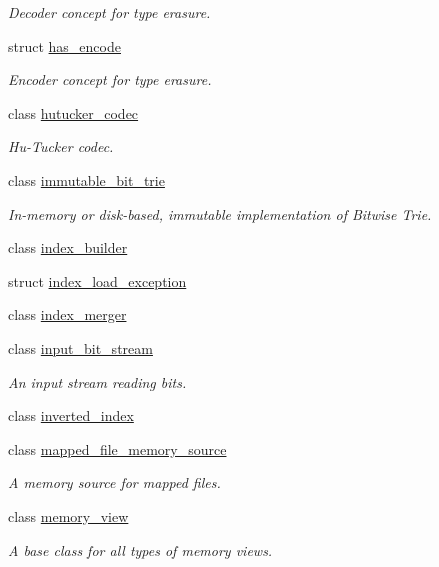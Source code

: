\begin{DoxyCompactItemize}
\begin{DoxyCompactList}\small\item\em Decoder concept for type erasure. \end{DoxyCompactList}\item 
struct \mbox{\hyperlink{structirk_1_1has__encode}{has\+\_\+encode}}
\begin{DoxyCompactList}\small\item\em Encoder concept for type erasure. \end{DoxyCompactList}\item 
class \mbox{\hyperlink{classirk_1_1hutucker__codec}{hutucker\+\_\+codec}}
\begin{DoxyCompactList}\small\item\em Hu-\/\+Tucker codec. \end{DoxyCompactList}\item 
class \mbox{\hyperlink{classirk_1_1immutable__bit__trie}{immutable\+\_\+bit\+\_\+trie}}
\begin{DoxyCompactList}\small\item\em In-\/memory or disk-\/based, immutable implementation of Bitwise Trie. \end{DoxyCompactList}\item 
class \mbox{\hyperlink{classirk_1_1index__builder}{index\+\_\+builder}}
\item 
struct \mbox{\hyperlink{structirk_1_1index__load__exception}{index\+\_\+load\+\_\+exception}}
\item 
class \mbox{\hyperlink{classirk_1_1index__merger}{index\+\_\+merger}}
\item 
class \mbox{\hyperlink{classirk_1_1input__bit__stream}{input\+\_\+bit\+\_\+stream}}
\begin{DoxyCompactList}\small\item\em An input stream reading bits. \end{DoxyCompactList}\item 
class \mbox{\hyperlink{classirk_1_1inverted__index}{inverted\+\_\+index}}
\item 
class \mbox{\hyperlink{classirk_1_1mapped__file__memory__source}{mapped\+\_\+file\+\_\+memory\+\_\+source}}
\begin{DoxyCompactList}\small\item\em A memory source for mapped files. \end{DoxyCompactList}\item 
class \mbox{\hyperlink{classirk_1_1memory__view}{memory\+\_\+view}}
\begin{DoxyCompactList}\small\item\em A base class for all types of memory views. \end{DoxyCompactList}\item 

\end{DoxyCompactItemize}
